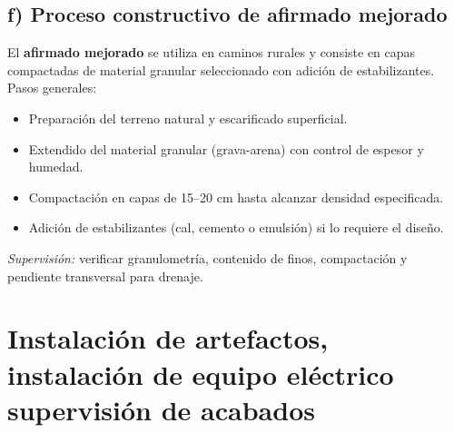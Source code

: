 \documentclass[12pt]{article}
\begin{document}
	\subsection*{f) Proceso constructivo de afirmado mejorado}
	El \textbf{afirmado mejorado} se utiliza en caminos rurales y consiste en capas compactadas de material granular seleccionado con adición de estabilizantes.  
	Pasos generales:
	\begin{itemize}[leftmargin=*, itemsep=2pt]
		\item Preparación del terreno natural y escarificado superficial.
		\item Extendido del material granular (grava-arena) con control de espesor y humedad.
		\item Compactación en capas de 15–20 cm hasta alcanzar densidad especificada.
		\item Adición de estabilizantes (cal, cemento o emulsión) si lo requiere el diseño.
	\end{itemize}
	\textit{Supervisión:} verificar granulometría, contenido de finos, compactación y pendiente transversal para drenaje.
	
	
	
	
	
	
	\section{Instalación de artefactos, instalación de equipo eléctrico supervisión de acabados}
	
	\small
	\renewcommand{\arraystretch}{1.2}
	
\end{document}
